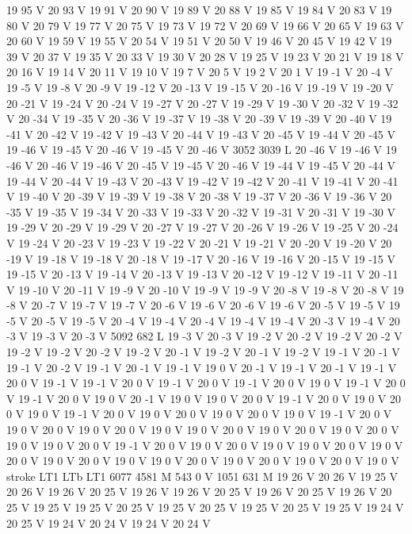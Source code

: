 {{19 95 V
20 93 V
19 91 V
20 90 V
19 89 V
20 88 V
19 85 V
19 84 V
20 83 V
19 80 V
20 79 V
19 77 V
20 75 V
19 73 V
19 72 V
20 69 V
19 66 V
20 65 V
19 63 V
20 60 V
19 59 V
19 55 V
20 54 V
19 51 V
20 50 V
19 46 V
20 45 V
19 42 V
19 39 V
20 37 V
19 35 V
20 33 V
19 30 V
20 28 V
19 25 V
19 23 V
20 21 V
19 18 V
20 16 V
19 14 V
20 11 V
19 10 V
19 7 V
20 5 V
19 2 V
20 1 V
19 -1 V
20 -4 V
19 -5 V
19 -8 V
20 -9 V
19 -12 V
20 -13 V
19 -15 V
20 -16 V
19 -19 V
19 -20 V
20 -21 V
19 -24 V
20 -24 V
19 -27 V
20 -27 V
19 -29 V
19 -30 V
20 -32 V
19 -32 V
20 -34 V
19 -35 V
20 -36 V
19 -37 V
19 -38 V
20 -39 V
19 -39 V
20 -40 V
19 -41 V
20 -42 V
19 -42 V
19 -43 V
20 -44 V
19 -43 V
20 -45 V
19 -44 V
20 -45 V
19 -46 V
19 -45 V
20 -46 V
19 -45 V
20 -46 V
3052 3039 L
20 -46 V
19 -46 V
19 -46 V
20 -46 V
19 -46 V
20 -45 V
19 -45 V
20 -46 V
19 -44 V
19 -45 V
20 -44 V
19 -44 V
20 -44 V
19 -43 V
20 -43 V
19 -42 V
19 -42 V
20 -41 V
19 -41 V
20 -41 V
19 -40 V
20 -39 V
19 -39 V
19 -38 V
20 -38 V
19 -37 V
20 -36 V
19 -36 V
20 -35 V
19 -35 V
19 -34 V
20 -33 V
19 -33 V
20 -32 V
19 -31 V
20 -31 V
19 -30 V
19 -29 V
20 -29 V
19 -29 V
20 -27 V
19 -27 V
20 -26 V
19 -26 V
19 -25 V
20 -24 V
19 -24 V
20 -23 V
19 -23 V
19 -22 V
20 -21 V
19 -21 V
20 -20 V
19 -20 V
20 -19 V
19 -18 V
19 -18 V
20 -18 V
19 -17 V
20 -16 V
19 -16 V
20 -15 V
19 -15 V
19 -15 V
20 -13 V
19 -14 V
20 -13 V
19 -13 V
20 -12 V
19 -12 V
19 -11 V
20 -11 V
19 -10 V
20 -11 V
19 -9 V
20 -10 V
19 -9 V
19 -9 V
20 -8 V
19 -8 V
20 -8 V
19 -8 V
20 -7 V
19 -7 V
19 -7 V
20 -6 V
19 -6 V
20 -6 V
19 -6 V
20 -5 V
19 -5 V
19 -5 V
20 -5 V
19 -5 V
20 -4 V
19 -4 V
20 -4 V
19 -4 V
19 -4 V
20 -3 V
19 -4 V
20 -3 V
19 -3 V
20 -3 V
5092 682 L
19 -3 V
20 -3 V
19 -2 V
20 -2 V
19 -2 V
20 -2 V
19 -2 V
19 -2 V
20 -2 V
19 -2 V
20 -1 V
19 -2 V
20 -1 V
19 -2 V
19 -1 V
20 -1 V
19 -1 V
20 -2 V
19 -1 V
20 -1 V
19 -1 V
19 0 V
20 -1 V
19 -1 V
20 -1 V
19 -1 V
20 0 V
19 -1 V
19 -1 V
20 0 V
19 -1 V
20 0 V
19 -1 V
20 0 V
19 0 V
19 -1 V
20 0 V
19 -1 V
20 0 V
19 0 V
20 -1 V
19 0 V
19 0 V
20 0 V
19 -1 V
20 0 V
19 0 V
20 0 V
19 0 V
19 -1 V
20 0 V
19 0 V
20 0 V
19 0 V
20 0 V
19 0 V
19 -1 V
20 0 V
19 0 V
20 0 V
19 0 V
20 0 V
19 0 V
19 0 V
20 0 V
19 0 V
20 0 V
19 0 V
20 0 V
19 0 V
19 0 V
20 0 V
19 -1 V
20 0 V
19 0 V
20 0 V
19 0 V
19 0 V
20 0 V
19 0 V
20 0 V
19 0 V
20 0 V
19 0 V
19 0 V
20 0 V
19 0 V
20 0 V
19 0 V
20 0 V
19 0 V
stroke
LT1
LTb
LT1
6077 4581 M
543 0 V
1051 631 M
19 26 V
20 26 V
19 25 V
20 26 V
19 26 V
20 25 V
19 26 V
19 26 V
20 25 V
19 26 V
20 25 V
19 26 V
20 25 V
19 25 V
19 25 V
20 25 V
19 25 V
20 25 V
19 25 V
20 25 V
19 25 V
19 24 V
20 25 V
19 24 V
20 24 V
19 24 V
20 24 V
}}
